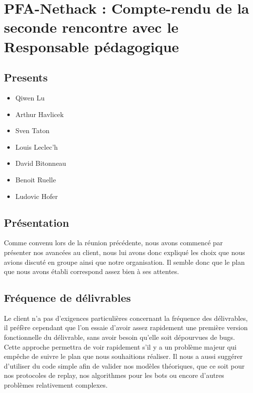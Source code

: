 \documentclass{article}
\newcommand {\ST}{Sven Taton}
\newcommand {\QL}{Qiwen Lu}
\newcommand {\LL}{Louis Leclec'h}
\newcommand {\DB}{David Bitonneau}
\newcommand {\AH}{Arthur Havlicek}
\newcommand {\BR}{Benoit Ruelle}
\newcommand {\LH}{Ludovic Hofer}
\begin{document}
\section*{PFA-Nethack : Compte-rendu de la seconde rencontre avec le Responsable pédagogique}

\subsection*{Presents}
\begin{itemize}
\item \QL
\item \AH
\item \ST
\item \LL
\item \DB
\item \BR
\item \LH
\end{itemize}

\subsection*{Présentation}
Comme convenu lors de la réunion précédente, nous avons commencé par présenter nos avancées au client, nous lui avons donc expliqué les choix que nous avions discuté en groupe ainsi que notre organisation. Il semble donc que le plan que nous avons établi correspond assez bien à ses attentes.

\subsection*{Fréquence de délivrables}
Le client n'a pas d'exigences particulières concernant la fréquence des délivrables, il préfère cependant que l'on essaie d'avoir assez rapidement une première version fonctionnelle du délivrable, sans avoir besoin qu'elle soit dépourvues de bugs. Cette approche permettra de voir rapidement s'il y a un problème majeur qui empêche de suivre le plan que nous souhaitions réaliser. Il nous a aussi suggérer d'utiliser du code simple afin de valider nos modèles théoriques, que ce soit pour nos protocoles de replay, nos algorithmes pour les bots ou encore d'autres problèmes relativement complexes.
\end{document}
